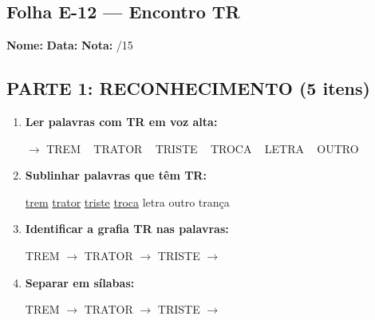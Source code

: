 \subsection{Folha E-12 --- Encontro TR}
\begin{exercicio}



\noindent\textbf{Nome:} \underline{\hspace{3.2cm}} \quad \textbf{Data:} \underline{\hspace{1.6cm}} \quad \textbf{Nota:} \underline{\hspace{0.9cm}}/15


\subsection*{PARTE 1: RECONHECIMENTO (5 itens)}

\begin{enumerate}

  \item \textbf{Ler palavras com TR em voz alta:}
  \begin{center}
  $\rightarrow$ TREM ~ TRATOR ~ TRISTE ~ TROCA ~ LETRA ~ OUTRO
  \end{center}

  \item \textbf{Sublinhar palavras que têm TR:}

\begin{center}
  \uline{trem} \quad \uline{trator} \quad \uline{triste} \quad \uline{troca} \quad letra \quad outro \quad trança
\end{center}

  \item \textbf{Identificar a grafia TR nas palavras:}
  \begin{center}
  TREM $\rightarrow$ \underline{\hspace{1cm}} \quad TRATOR $\rightarrow$ \underline{\hspace{1cm}} \quad TRISTE $\rightarrow$ \underline{\hspace{1cm}}
  \end{center}

  \item \textbf{Separar em sílabas:}
  \begin{center}
  TREM $\rightarrow$ \underline{\hspace{1.2cm}} \quad TRATOR $\rightarrow$ \underline{\hspace{1.2cm}} \quad TRISTE $\rightarrow$ \underline{\hspace{1.2cm}}
  \end{center}


\end{enumerate}
\end{exercicio}
